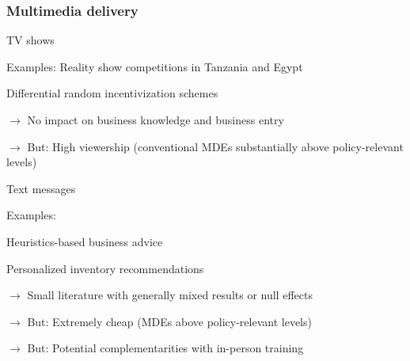 \documentclass[hideothersubsections, usenames,dvipsnames,11pt]{beamer}
\newenvironment{itemize_2pt}{\itemize\addtolength{\itemsep}{2pt}}{\enditemize}
\begin{document}
\begin{frame}
\frametitle{Multimedia delivery}
TV shows
\begin{itemize_2pt}
	\item Examples: \textcolor{bdf}{Reality show competitions} in Tanzania \citep{Bjorvatn2020} and Egypt \citep{Barsoum2018}
	\item Differential random incentivization schemes
	\item[] $\rightarrow$ \textcolor{bdf}{No impact} on business knowledge and business entry 
	\item[] $\rightarrow$ But: \textcolor{bdf}{High viewership} (conventional MDEs substantially above policy-relevant levels) 
 
\end{itemize_2pt}

\pause
	
\vspace{0.5em}
	
Text messages
\begin{itemize_2pt}
	\item Examples: 
	\begin{itemize_2pt}
		\item Heuristics-based business advice \citep{Cole2018}
		\item Personalized inventory recommendations \citep{Acimovic2020}
	\end{itemize_2pt}
	\item[] $\rightarrow$ Small literature with generally \textcolor{bdf}{mixed results or null effects}
	\item[] $\rightarrow$ But: \textcolor{bdf}{Extremely cheap} (MDEs above policy-relevant levels)
	\item[] $\rightarrow$ But: \textcolor{bdf}{Potential complementarities} with in-person training
\end{itemize_2pt}
\end{frame}



\end{document}
